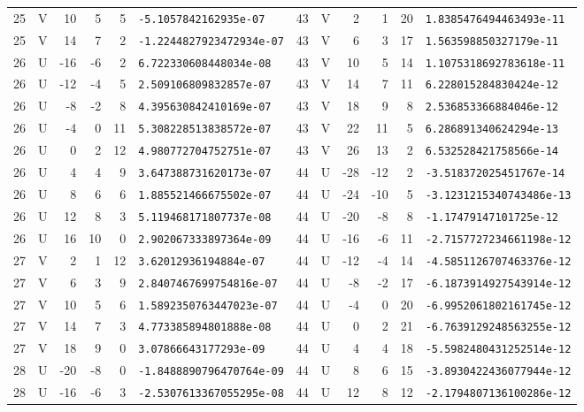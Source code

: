 \begin{longtable}{rcrrrl|rcrrrl}
25 & V & 10 & 5 & 5 & \texttt{-5.1057842162935e-07} & 43 & V & 2 & 1 & 20 & \texttt{1.8385476494463493e-11}\\
25 & V & 14 & 7 & 2 & \texttt{-1.2244827923472934e-07} & 43 & V & 6 & 3 & 17 & \texttt{1.563598850327179e-11}\\
26 & U & -16 & -6 & 2 & \texttt{6.722330608448034e-08} & 43 & V & 10 & 5 & 14 & \texttt{1.1075318692783618e-11}\\
26 & U & -12 & -4 & 5 & \texttt{2.509106809832857e-07} & 43 & V & 14 & 7 & 11 & \texttt{6.228015284830424e-12}\\
26 & U & -8 & -2 & 8 & \texttt{4.395630842410169e-07} & 43 & V & 18 & 9 & 8 & \texttt{2.536853366884046e-12}\\
26 & U & -4 & 0 & 11 & \texttt{5.308228513838572e-07} & 43 & V & 22 & 11 & 5 & \texttt{6.286891340624294e-13}\\
26 & U & 0 & 2 & 12 & \texttt{4.980772704752751e-07} & 43 & V & 26 & 13 & 2 & \texttt{6.532528421758566e-14}\\
26 & U & 4 & 4 & 9 & \texttt{3.647388731620173e-07} & 44 & U & -28 & -12 & 2 & \texttt{-3.518372025451767e-14}\\
26 & U & 8 & 6 & 6 & \texttt{1.885521466675502e-07} & 44 & U & -24 & -10 & 5 & \texttt{-3.1231215340743486e-13}\\
26 & U & 12 & 8 & 3 & \texttt{5.119468171807737e-08} & 44 & U & -20 & -8 & 8 & \texttt{-1.17479147101725e-12}\\
26 & U & 16 & 10 & 0 & \texttt{2.902067333897364e-09} & 44 & U & -16 & -6 & 11 & \texttt{-2.7157727234661198e-12}\\
27 & V & 2 & 1 & 12 & \texttt{3.62012936194884e-07} & 44 & U & -12 & -4 & 14 & \texttt{-4.5851126707463376e-12}\\
27 & V & 6 & 3 & 9 & \texttt{2.8407467699754816e-07} & 44 & U & -8 & -2 & 17 & \texttt{-6.1873914927543914e-12}\\
27 & V & 10 & 5 & 6 & \texttt{1.5892350763447023e-07} & 44 & U & -4 & 0 & 20 & \texttt{-6.9952061802161745e-12}\\
27 & V & 14 & 7 & 3 & \texttt{4.773385894801888e-08} & 44 & U & 0 & 2 & 21 & \texttt{-6.7639129248563255e-12}\\
27 & V & 18 & 9 & 0 & \texttt{3.07866643177293e-09} & 44 & U & 4 & 4 & 18 & \texttt{-5.5982480431252514e-12}\\
28 & U & -20 & -8 & 0 & \texttt{-1.8488890796470764e-09} & 44 & U & 8 & 6 & 15 & \texttt{-3.8930422436077944e-12}\\
28 & U & -16 & -6 & 3 & \texttt{-2.5307613367055295e-08} & 44 & U & 12 & 8 & 12 & \texttt{-2.1794807136100286e-12}\\

\end{longtable}
